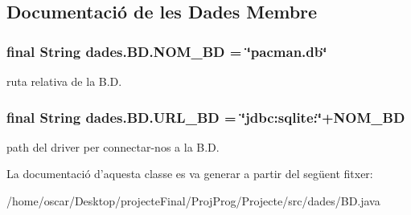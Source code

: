 \subsection{Documentació de les Dades Membre}
\hypertarget{classdades_1_1_b_d_a0244ade6a6066ad9f59f8f8e9b2e034e}{
\subsubsection[{N\+O\+M\+\_\+\+B\+D}]{\setlength{\rightskip}{0pt plus 5cm}final String dades.\+B\+D.\+N\+O\+M\+\_\+\+B\+D = \char`\"{}pacman.\+db\char`\"{}\hspace{0.3cm}{\ttfamily [static]}}}\label{classdades_1_1_b_d_a0244ade6a6066ad9f59f8f8e9b2e034e}


ruta relativa de la B.\+D. 

\hypertarget{classdades_1_1_b_d_abc83c541acdcd0be2ae8a33daa753077}{
\subsubsection[{U\+R\+L\+\_\+\+B\+D}]{\setlength{\rightskip}{0pt plus 5cm}final String dades.\+B\+D.\+U\+R\+L\+\_\+\+B\+D = \char`\"{}jdbc\+:sqlite\+:\char`\"{}+N\+O\+M\+\_\+\+B\+D\hspace{0.3cm}{\ttfamily [static]}}}\label{classdades_1_1_b_d_abc83c541acdcd0be2ae8a33daa753077}


path del driver per connectar-\/nos a la B.\+D. 



La documentació d'aquesta classe es va generar a partir del següent fitxer\+:\begin{DoxyCompactItemize}
\item 
/home/oscar/\+Desktop/projecte\+Final/\+Proj\+Prog/\+Projecte/src/dades/B\+D.\+java\end{DoxyCompactItemize}
